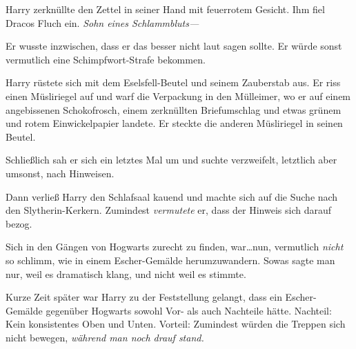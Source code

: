 Harry zerknüllte den Zettel in seiner Hand mit feuerrotem Gesicht. Ihm fiel Dracos Fluch ein. \emph{Sohn eines Schlammbluts—}

Er wusste inzwischen, dass er das besser nicht laut sagen sollte. Er würde sonst vermutlich eine Schimpfwort-Strafe bekommen.

Harry rüstete sich mit dem Eselsfell-Beutel und seinem Zauberstab aus. Er riss einen Müsliriegel auf und warf die Verpackung in den Mülleimer, wo er auf einem angebissenen Schokofrosch, einem zerknüllten Briefumschlag und etwas grünem und rotem Einwickelpapier landete. Er steckte die anderen Müsliriegel in seinen Beutel.

Schließlich sah er sich ein letztes Mal um und suchte verzweifelt, letztlich aber umsonst, nach Hinweisen.

Dann verließ Harry den Schlafsaal kauend und machte sich auf die Suche nach den Slytherin-Kerkern. Zumindest \emph{vermutete} er, dass der Hinweis sich darauf bezog.

Sich in den Gängen von Hogwarts zurecht zu finden, war…nun, vermutlich \emph{nicht} so schlimm, wie in einem Escher-Gemälde herumzuwandern. Sowas sagte man nur, weil es dramatisch klang, und nicht weil es stimmte.

Kurze Zeit später war Harry zu der Feststellung gelangt, dass ein Escher-Gemälde gegenüber Hogwarts sowohl Vor- als auch Nachteile hätte. Nachteil: Kein konsistentes Oben und Unten. Vorteil: Zumindest würden die Treppen sich nicht bewegen, \emph{während man noch drauf stand.}

